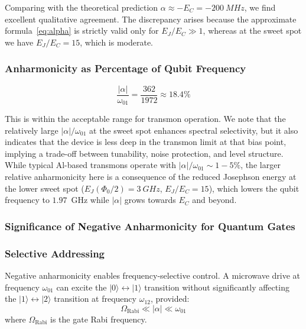 Comparing with the theoretical prediction $\alpha \approx -E_C = \SI{-200}{MHz}$, we find excellent qualitative agreement. The discrepancy arises because the approximate formula~\eqref{eq:alpha} is strictly valid only for $E_J/E_C \gg 1$, whereas at the sweet spot we have $E_J/E_C = 15$, which is moderate.

\subsubsection{Anharmonicity as Percentage of Qubit Frequency}

\begin{equation}
\frac{|\alpha|}{\omega_{01}} = \frac{362}{1972} \approx 18.4\%
\end{equation}

This is within the acceptable range for transmon operation. We note that the relatively large \(|\alpha|/\omega_{01}\) at the sweet spot enhances spectral selectivity, but it also indicates that the device is less deep in the transmon limit at that bias point, implying a trade-off between tunability, noise protection, and level structure.  While typical Al-based transmons operate with $|\alpha|/\omega_{01} \sim 1-5\%$, the larger relative anharmonicity here is a consequence of the reduced Josephson energy at the lower sweet spot ($E_J(\Phi_0/2)=\SI{3}{GHz}$, $E_J/E_C=15$), which lowers the qubit frequency to $1.97$~GHz while $|\alpha|$ grows towards $E_C$ and beyond.

\subsubsection{Significance of Negative Anharmonicity for Quantum Gates}

\subsubsection{Selective Addressing}

Negative anharmonicity enables frequency-selective control. A microwave drive at frequency $\omega_{01}$ can excite the $|0\rangle \leftrightarrow |1\rangle$ transition without significantly affecting the $|1\rangle \leftrightarrow |2\rangle$ transition at frequency $\omega_{12}$, provided:
\begin{equation}
\Omega_{\text{Rabi}} \ll |\alpha| \ll \omega_{01}
\end{equation}
where $\Omega_{\text{Rabi}}$ is the gate Rabi frequency.

